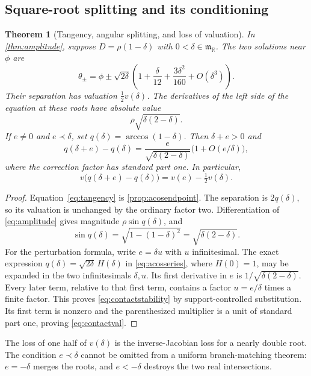 \documentclass[11pt]{article}
\numberwithin{equation}{section}
\newtheorem{theorem}{Theorem}[section]
\theoremstyle{definition}
\newcommand{\R}{\mathbb R}
\newcommand{\mm}{\mathfrak m}
\begin{document}
\subsection{Square-root splitting and its conditioning}
\begin{theorem}[Tangency, angular splitting, and loss of valuation]\label{thm:tangency}
In \cref{thm:amplitude}, suppose $D=\rho(1-\delta)$ with $0<\delta\in\mm_{\R}$. The two solutions near $\phi$ are
\begin{equation}\label{eq:tangency}
 \theta_\pm=\phi\pm\sqrt{2\delta}
 \left(1+\frac\delta{12}+\frac{3\delta^2}{160}+O(\delta^3)\right).
\end{equation}
Their separation has valuation $\tfrac12v(\delta)$. The derivatives of the left side of the equation at these roots have absolute value
\begin{equation}\label{eq:jacobiancontact}
 \rho\sqrt{\delta(2-\delta)}.
\end{equation}
If $e\ne0$ and $e\prec\delta$, set $q(\delta)=\arccos(1-\delta)$. Then $\delta+e>0$ and
\begin{equation}\label{eq:contactstability}
 q(\delta+e)-q(\delta)
 =\frac{e}{\sqrt{\delta(2-\delta)}}
       \bigl(1+O(e/\delta)\bigr),
\end{equation}
where the correction factor has standard part one. In particular,
\begin{equation}\label{eq:contactval}
 v\bigl(q(\delta+e)-q(\delta)\bigr)
 =v(e)-\tfrac12v(\delta).
\end{equation}
\end{theorem}
\begin{proof}
Equation~\eqref{eq:tangency} is \cref{prop:acosendpoint}. The separation is $2q(\delta)$, so its valuation is unchanged by the ordinary factor two. Differentiation of \eqref{eq:amplitude} gives magnitude $\rho\sin q(\delta)$, and
\[
 \sin q(\delta)=\sqrt{1-(1-\delta)^2}=\sqrt{\delta(2-\delta)}.
\]
For the perturbation formula, write $e=\delta u$ with $u$ infinitesimal. The exact expression $q(\delta)=\sqrt{2\delta}\,H(\delta)$ in \eqref{eq:acosseries}, where $H(0)=1$, may be expanded in the two infinitesimals $\delta,u$. Its first derivative in $e$ is $1/\sqrt{\delta(2-\delta)}$. Every later term, relative to that first term, contains a factor $u=e/\delta$ times a finite factor. This proves \eqref{eq:contactstability} by support-controlled substitution. Its first term is nonzero and the parenthesized multiplier is a unit of standard part one, proving \eqref{eq:contactval}.
\end{proof}
The loss of one half of $v(\delta)$ is the inverse-Jacobian loss for a nearly double root. The condition $e\prec\delta$ cannot be omitted from a uniform branch-matching theorem: $e=-\delta$ merges the roots, and $e<-\delta$ destroys the two real intersections.
\end{document}
